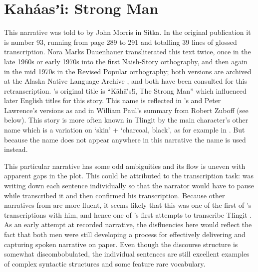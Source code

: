 
\resetexcnt
\chapter{Kaháasʼi: Strong Man}\label{ch:93-strong-man}

This narrative was told to \citeauthor{swanton:1909} by  John Morris in Sitka.
In the original publication it is number 93, running from page 289 to 291 and totalling 39 lines of glossed transcription.
 Nora Marks Dauenhauer transliterated this text twice, once in the late 1960s or early 1970s into the first Naish-Story orthography, and then again in the mid 1970s in the Revised Popular orthography; both versions are archived at the Alaska Native Language Archive \parencite{dauenhauer:1971b}, and both have been consulted for this retranscription.
\citeauthor{swanton:1909}’s original title is “Kāhā′s!î, The Strong Man” which influenced later English titles for this story.
This name  is reflected in ’s and  Peter Lawrence’s versions as  \parencites[146]{swanton:1909}[890]{de-laguna:1972} and in  William Paul’s summary from  Robert Zuboff (see below).
This story is more often known in Tlingit by the main character’s other name  which is a variation on  ‘skin’ +  ‘charcoal, black’, as for example in \cite[136–151]{dauenhauer:1987}.
But because the name  does not appear anywhere in this narrative the name  is used instead.

This particular narrative has some odd ambiguities and its flow is uneven with apparent gaps in the plot.
This could be attributed to the transcription task: \citeauthor{swanton:1909} was writing down each sentence individually so that the narrator would have to pause while \citeauthor{swanton:1909} transcribed it and then confirmed his transcription.
Because other narratives from  are more fluent, it seems likely that this was one of the first of \citeauthor{swanton:1909}’s transcriptions with him, and hence one of \citeauthor{swanton:1909}’s first attempts to transcribe Tlingit \parencite[??]{jones:2017}.
As an early attempt at recorded narrative, the disfluencies here would reflect the fact that both men were still developing a process for effectively delivering and capturing spoken narrative on paper.
Even though the discourse structure is somewhat discombobulated, the individual sentences are still excellent examples of complex syntactic structures and some feature rare vocabulary.


